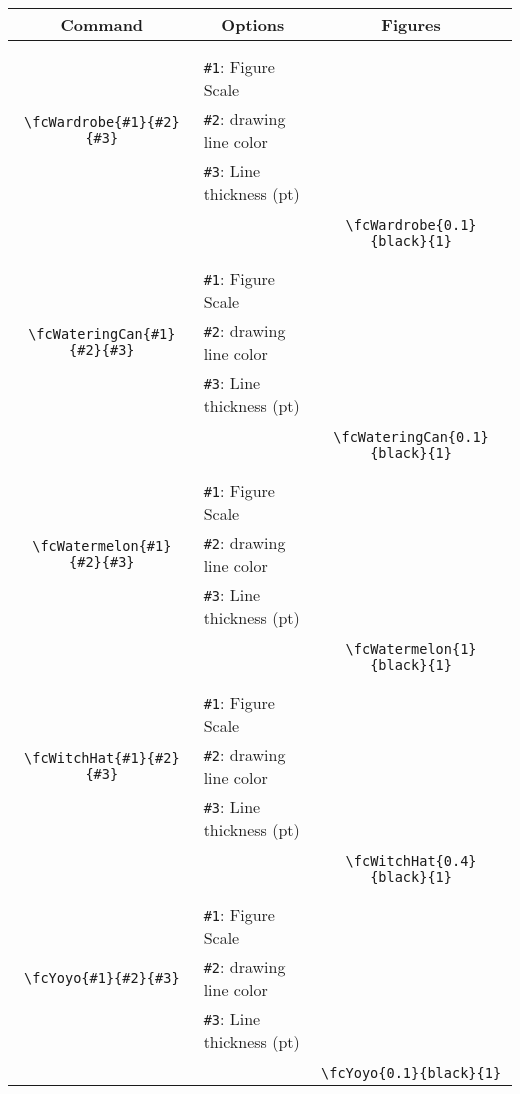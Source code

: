 \documentclass[x11names]{article}
\begin{document}
\begin{table}[H]\centering\begin{tabular}{|c|l|c|}\hline {\bf Command}& \multicolumn{1}{c|}{{\bf Options}} & {\bf Figures}\\  \hline	&&\multirow{5}{*}{\fcWardrobe{0.1}{black}{1}}\\	&&\\	&\verb|#1|: Figure Scale &\\	\verb|\fcWardrobe{#1}{#2}{#3}|&	\verb|#2|: drawing line color &\\	&\verb|#3|: Line thickness (pt) &\\ &&\\&&	\verb|\fcWardrobe{0.1}{black}{1}|\\\hline 	
	&&\multirow{5}{*}{\fcWateringCan{0.1}{black}{1}}\\	&&\\	&\verb|#1|: Figure Scale &\\	\verb|\fcWateringCan{#1}{#2}{#3}|&	\verb|#2|: drawing line color &\\	&\verb|#3|: Line thickness (pt) &\\ &&\\&&	\verb|\fcWateringCan{0.1}{black}{1}|\\\hline 	
	&&\multirow{5}{*}{\fcWatermelon{1}{black}{1}}\\	&&\\	&\verb|#1|: Figure Scale &\\	\verb|\fcWatermelon{#1}{#2}{#3}|&	\verb|#2|: drawing line color &\\	&\verb|#3|: Line thickness (pt) &\\ &&\\&&	\verb|\fcWatermelon{1}{black}{1}|\\\hline 	
	&&\multirow{5}{*}{\fcWitchHat{0.4}{black}{1}}\\	&&\\	&\verb|#1|: Figure Scale &\\	\verb|\fcWitchHat{#1}{#2}{#3}|&	\verb|#2|: drawing line color &\\	&\verb|#3|: Line thickness (pt) &\\ &&\\&&	\verb|\fcWitchHat{0.4}{black}{1}|\\\hline 	
	&&\multirow{5}{*}{\fcYoyo{0.1}{black}{1}}\\	&&\\	&\verb|#1|: Figure Scale &\\	\verb|\fcYoyo{#1}{#2}{#3}|&	\verb|#2|: drawing line color &\\	&\verb|#3|: Line thickness (pt) &\\ &&\\&&	\verb|\fcYoyo{0.1}{black}{1}|\\\hline 	

\end{tabular}
\end{table}
\end{document}
